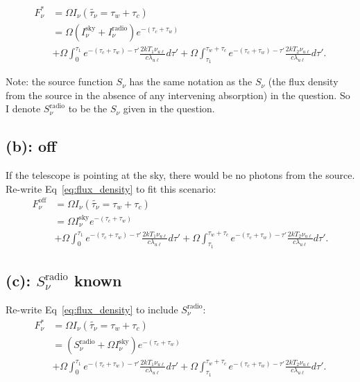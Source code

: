 \documentclass[12pt,letterpaper]{article}
\newcommand{\Isky}{I_\nu^{\textrm{sky}}}
\newcommand{\Iradio}{I_\nu^{\textrm{radio}}}
\newcommand{\Snuradio}{S_\nu^{\textrm{radio}}}
\begin{document}
\begin{equation}
    \begin{split}
        F_\nu^{*} &= \Omega I_{\nu}(\tilde{\tau_\nu} = \tau_w + \tau_c)\\
        &= \Omega (\Isky + \Iradio)e^{-(\tau_c + \tau_w)}\\
        &+ 
        \Omega\int_0^{\tau_1} e^{-(\tau_c + \tau_w) - \tau'} 
        \frac{2 k T_{1} \nu_{u \ell}}{c \lambda_{u \ell}} d\tau'
        + 
        \Omega\int_{\tau_1}^{\tau_w + \tau_c} e^{-(\tau_c + \tau_w) - \tau'} 
        \frac{2 k T_{2} \nu_{u \ell}}{c \lambda_{u \ell}} d\tau'.
    \end{split}
    \label{eq:flux_density}
\end{equation}

Note: the source function $S_\nu$ has the same notation as the $S_\nu$ (the flux density from the source in the absence of any intervening absorption) in the question.
So I denote $\Snuradio$ to be the $S_\nu$ given in the question.

\subsection*{(b): off}
If the telescope is pointing at the sky, there would be no photons from the source.
Re-write Eq~\ref{eq:flux_density} to fit this scenario:
\begin{equation}
    \begin{split}
        F_\nu^{\textrm{off}} &= \Omega I_{\nu}(\tilde{\tau_\nu} = \tau_w + \tau_c)\\
        &= \Omega \Isky e^{-(\tau_c + \tau_w)}\\
        &+ 
        \Omega\int_0^{\tau_1} e^{-(\tau_c + \tau_w) - \tau'} 
        \frac{2 k T_{1} \nu_{u \ell}}{c \lambda_{u \ell}} d\tau'
        + 
        \Omega\int_{\tau_1}^{\tau_w + \tau_c} e^{-(\tau_c + \tau_w) - \tau'} 
        \frac{2 k T_{2} \nu_{u \ell}}{c \lambda_{u \ell}} d\tau'.
    \end{split}
    \label{eq:off}    
\end{equation}

\subsection*{(c): $\Snuradio$ known}
Re-write Eq~\ref{eq:flux_density} to include $\Snuradio$:
\begin{equation}
    \begin{split}
        F_\nu^{*} &= \Omega I_{\nu}(\tilde{\tau_\nu} = \tau_w + \tau_c)\\
        &= (\Snuradio + \Omega\Isky)e^{-(\tau_c + \tau_w)}\\
        &+ 
        \Omega\int_0^{\tau_1} e^{-(\tau_c + \tau_w) - \tau'} 
        \frac{2 k T_{1} \nu_{u \ell}}{c \lambda_{u \ell}} d\tau'
        + 
        \Omega\int_{\tau_1}^{\tau_w + \tau_c} e^{-(\tau_c + \tau_w) - \tau'} 
        \frac{2 k T_{2} \nu_{u \ell}}{c \lambda_{u \ell}} d\tau'.
    \end{split}
\end{equation}
\end{document}
